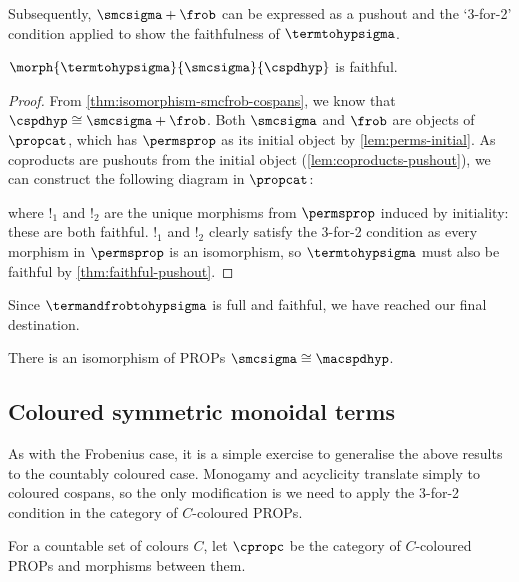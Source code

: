 Subsequently, \(\smcsigma + \frob\) can be expressed as a pushout and the
`3-for-2' condition applied to show the faithfulness of \(\termtohypsigma\).

\begin{proposition}
    \(\morph{\termtohypsigma}{\smcsigma}{\cspdhyp}\) is faithful.
\end{proposition}
\begin{proof}
    From \cref{thm:isomorphism-smcfrob-cospans}, we know that
    \(\cspdhyp \cong \smcsigma + \frob\).
    Both \(\smcsigma\) and \(\frob\) are objects of \(\propcat\), which has
    \(\permsprop\) as its initial object by \cref{lem:perms-initial}.
    As coproducts are pushouts from the initial object
    (\cref{lem:coproducts-pushout}), we can construct the following diagram in
    \(\propcat\):
    \begin{center}
        
    \end{center}
    where \(!_1\) and \(!_2\) are the unique morphisms from
    \(\permsprop\) induced by initiality: these are both faithful.
    \(!_1\) and \(!_2\) clearly satisfy the 3-for-2 condition as every morphism
    in \(\permsprop\) is an isomorphism, so \(\termtohypsigma\) must also
    be faithful by \cref{thm:faithful-pushout}.
\end{proof}

Since \(\termandfrobtohypsigma\) is full and faithful, we have reached our
final destination.

\begin{corollary}
    There is an isomorphism of PROPs \(\smcsigma \cong \macspdhyp\).
\end{corollary}

\subsection{Coloured symmetric monoidal terms}

As with the Frobenius case, it is a simple exercise to generalise the above
results to the countably coloured case.
Monogamy and acyclicity translate simply to coloured cospans, so the only
modification is we need to apply the 3-for-2 condition in the category of
\(C\)-coloured PROPs.

\begin{definition}
    For a countable set of colours \(C\), let \(\cpropc\) be the category of
    \(C\)-coloured PROPs and morphisms between them.
\end{definition}

